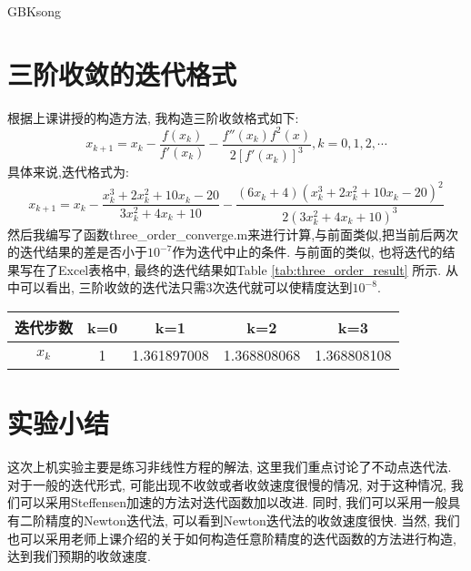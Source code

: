 \documentclass[a4paper]{article}
\begin{document}
\begin{CJK*}{GBK}{song}
\section{三阶收敛的迭代格式}
根据上课讲授的构造方法, 我构造三阶收敛格式如下:
\begin{equation}
x_{k+1}=x_k-\frac{f(x_k)}{f'(x_k)}- \frac{f''(x_k)f^2(x)}{2[f'(x_k)]^3}, k=0, 1, 2, \cdots
\end{equation}
具体来说,迭代格式为:
\begin{equation}
x_{k+1}=x_k - \frac{x_k^3+2x_k^2+10x_k-20}{3x_k^2+4x_k+10} - \frac{(6x_k+4)(x_k^3+2x_k^2+10x_k-20)^2}{2(3x_k^2+4x_k+10)^3} 
\end{equation}
然后我编写了函数three\_order\_converge.m来进行计算,与前面类似,把当前后两次的迭代结果的差是否小于$10^{-7}$作为迭代中止的条件. 与前面的类似, 也将迭代的结果写在了Excel表格中, 最终的迭代结果如Table \ref{tab:three_order_result} 所示. 从中可以看出, 三阶收敛的迭代法只需3次迭代就可以使精度达到$10^{-8}$.

\begin{table*}[!htbp]
\centering
\begin{threeparttable}[!htpb]
 \caption{\label{tab:three_order_result}采用三阶收敛迭代方法后的迭代结果}
 \begin{tabular}{ccccc}
 \toprule
 迭代步数 &k=0 & k=1	&k=2	&	k=3	\\ \hline
$x_k$ &1&1.361897008	&1.368808068	&1.368808108\\
\bottomrule
\end{tabular}
\end{threeparttable}%
\end{table*}


\section{实验小结}
这次上机实验主要是练习非线性方程的解法, 这里我们重点讨论了不动点迭代法. 对于一般的迭代形式, 可能出现不收敛或者收敛速度很慢的情况, 对于这种情况, 我们可以采用Steffensen加速的方法对迭代函数加以改进. 同时, 我们可以采用一般具有二阶精度的Newton迭代法, 可以看到Newton迭代法的收敛速度很快. 当然, 我们也可以采用老师上课介绍的关于如何构造任意阶精度的迭代函数的方法进行构造, 达到我们预期的收敛速度.





\end{CJK*}
\end{document}
